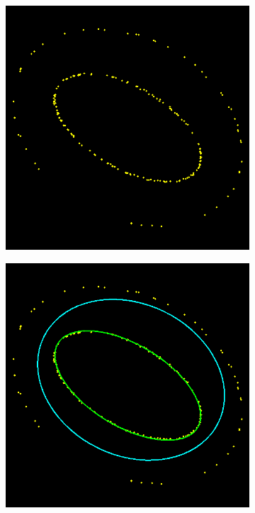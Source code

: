 \begin{figure}[!htb]
	\begin{subfigure}{.5\textwidth}
		\centering
		\includegraphics[width=.9\textwidth]{images/ransacShadow25_0.png}
	\end{subfigure}%
	\begin{subfigure}{.5\textwidth}
		\centering
		\includegraphics[width=.9\textwidth]{images/ransacShadow25_1.png}

\end{subfigure}
\end{figure}
